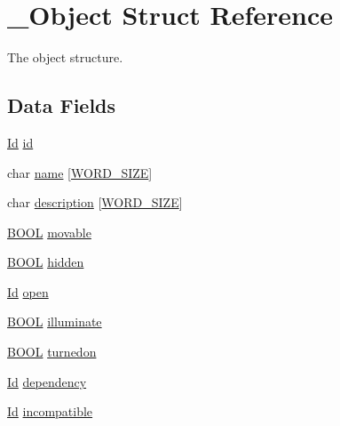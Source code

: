 \hypertarget{struct__Object}{}\section{\+\_\+\+Object Struct Reference}
\label{struct__Object}


The object structure.  


\subsection*{Data Fields}
\begin{DoxyCompactItemize}
\item 
\hyperlink{types_8h_a845e604fb28f7e3d97549da3448149d3}{Id} \hyperlink{struct__Object_a3cff7a0e8dc4e9d23895ed9af1b7653a}{id}
\item 
char \hyperlink{struct__Object_a3dab853826b88558a2c07dec50b96d57}{name} \mbox{[}\hyperlink{types_8h_a92ed8507d1cd2331ad09275c5c4c1c89}{W\+O\+R\+D\+\_\+\+S\+I\+ZE}\mbox{]}
\item 
char \hyperlink{struct__Object_a556e2e37c1461bcaae6492d2101f407d}{description} \mbox{[}\hyperlink{types_8h_a92ed8507d1cd2331ad09275c5c4c1c89}{W\+O\+R\+D\+\_\+\+S\+I\+ZE}\mbox{]}
\item 
\hyperlink{types_8h_a3e5b8192e7d9ffaf3542f1210aec18dd}{B\+O\+OL} \hyperlink{struct__Object_ae013850f78da07c39e530f36bf98f2b9}{movable}
\item 
\hyperlink{types_8h_a3e5b8192e7d9ffaf3542f1210aec18dd}{B\+O\+OL} \hyperlink{struct__Object_a44824966fc9f4d5f82c189b2e063ddc4}{hidden}
\item 
\hyperlink{types_8h_a845e604fb28f7e3d97549da3448149d3}{Id} \hyperlink{struct__Object_a0922dd9891e6aa617ce1d51ae27c0175}{open}
\item 
\hyperlink{types_8h_a3e5b8192e7d9ffaf3542f1210aec18dd}{B\+O\+OL} \hyperlink{struct__Object_a6e4edc37e6d8a5237a501c432a4296ca}{illuminate}
\item 
\hyperlink{types_8h_a3e5b8192e7d9ffaf3542f1210aec18dd}{B\+O\+OL} \hyperlink{struct__Object_a402198da362af7d49255f7e749d438be}{turnedon}
\item 
\hyperlink{types_8h_a845e604fb28f7e3d97549da3448149d3}{Id} \hyperlink{struct__Object_afec53e4289e64d19508e1f04c93de411}{dependency}
\item 
\hyperlink{types_8h_a845e604fb28f7e3d97549da3448149d3}{Id} \hyperlink{struct__Object_a2811b54563806d9ed618af6a78114898}{incompatible}
\end{DoxyCompactItemize}


